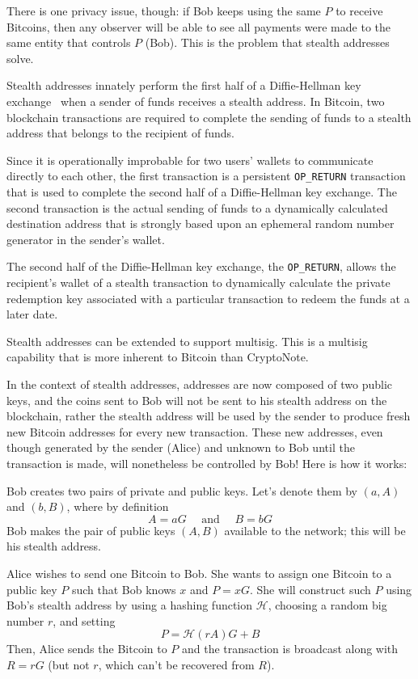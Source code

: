 There is one privacy issue, though: if Bob keeps using the same $P$ to receive Bitcoins, then any observer will be able to see all payments were made to the same entity that controls $P$ (Bob). This is the problem that stealth addresses solve.
\pagebreak

Stealth addresses innately perform the first half of a Diffie-Hellman key exchange~\cite{Diffie:2006:NDC:2263321.2269104} when a sender of funds receives a stealth address. In Bitcoin, two blockchain transactions are required to complete the sending of funds to a stealth address that belongs to the recipient of funds.

Since it is operationally improbable for two users' wallets to communicate directly to each other, the first transaction is a persistent \verb|OP_RETURN| transaction that is used to complete the second half of a Diffie-Hellman key exchange. The second transaction is the actual sending of funds to a dynamically calculated destination address that is strongly based upon an ephemeral random number generator in the sender's wallet.

The second half of the Diffie-Hellman key exchange, the \verb|OP_RETURN|, allows the recipient's wallet of a stealth transaction to dynamically calculate the private redemption key associated with a particular transaction to redeem the funds at a later date.

Stealth addresses can be extended to support multisig. This is a multisig capability that is more inherent to Bitcoin than CryptoNote.

In the context of stealth addresses, addresses are now composed of two public keys, and the coins sent to Bob will not be sent to his stealth address on the blockchain, rather the stealth address will be used by the sender to produce fresh new Bitcoin addresses for every new transaction. These new addresses, even though generated by the sender (Alice) and unknown to Bob until the transaction is made, will nonetheless be controlled by Bob! Here is how it works:

Bob creates two pairs of private and public keys. Let's denote them by $(a,A)$ and $(b,B)$, where by definition
\begin{equation}
  A = aG \quad \mbox{ and } \quad B = bG
\end{equation}
Bob makes the pair of public keys $(A,B)$ available to the network; this will be his stealth address.

Alice wishes to send one Bitcoin to Bob. She wants to assign one Bitcoin to a public key $P$ such that Bob knows $x$ and $P = xG$. She will construct such $P$ using Bob's stealth address by using a hashing function $\mathcal{H}$, choosing a random big number $r$, and setting
\begin{equation}
  P = \mathcal{H}(rA)G + B
\end{equation}
Then, Alice sends the Bitcoin to $P$ and the transaction is broadcast along with $R = rG$ (but not $r$, which can't be recovered from $R$).

